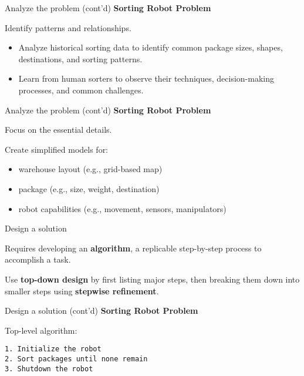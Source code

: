 \documentclass[sectionframe]{oxblue-beamer}
\begin{document}
\begin{frame}{Analyze the problem (cont'd)}
\textbf{Sorting Robot Problem}

\par\bigskip Identify patterns and relationships.

\par\bigskip \begin{itemize}
    \item Analyze historical sorting data to identify common package sizes, shapes, destinations, and sorting patterns.
    \item Learn from human sorters to observe their techniques, decision-making processes, and common challenges.
\end{itemize}

\end{frame}

\begin{frame}{Analyze the problem (cont'd)}
\textbf{Sorting Robot Problem}

\par\bigskip Focus on the essential details.

\par\bigskip Create simplified models for:
\begin{itemize}
    \item warehouse layout (e.g., grid-based map)
    \item package (e.g., size, weight, destination)
    \item robot capabilities (e.g., movement, sensors, manipulators)
\end{itemize}
\end{frame}

\begin{frame}{Design a solution}

Requires developing an \textbf{algorithm}, a replicable step-by-step process to accomplish a task.

\bigskip Use \textbf{top-down design} by first listing major steps, then breaking them down into smaller steps using \textbf{stepwise refinement}.
\end{frame}

\begin{frame}[fragile]{Design a solution (cont'd)}
\textbf{Sorting Robot Problem}

\bigskip Top-level algorithm:

\begin{verbatim}
1. Initialize the robot
2. Sort packages until none remain
3. Shutdown the robot
\end{verbatim}
\end{frame}
\end{document}
